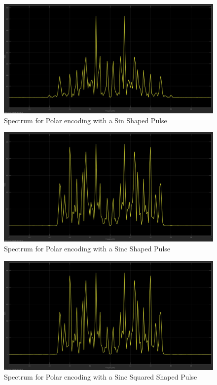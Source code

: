\documentclass{article}
\begin{document}
\begin{figure}[H]
  \includegraphics[width = \linewidth]{Polar_Sin_Spectrum.jpg}
  \caption{Spectrum for Polar encoding with a Sin Shaped Pulse}
  \label{fig:Polar-Sin-Spectrum}
\end{figure}
\begin{figure}[H]
  \includegraphics[width = \linewidth]{Polar_Sinc_Spectrum.jpg}
  \caption{Spectrum for Polar encoding with a Sinc Shaped Pulse}
  \label{fig:Polar-Sinc-Spectrum}
\end{figure}
\begin{figure}[H]
  \includegraphics[width = \linewidth]{Polar_Squared_Spectrum.jpg}
  \caption{Spectrum for Polar encoding with a Sinc Squared Shaped Pulse}
  \label{fig:Polar-Squared-Spectrum}
\end{figure}
\end{document}
